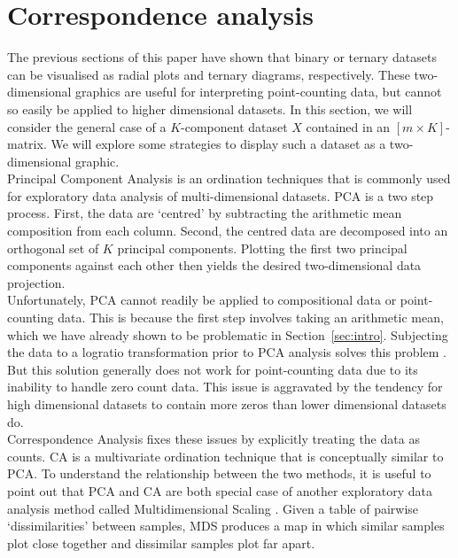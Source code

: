 \documentclass{article}
\begin{document}
\section{Correspondence analysis}
\label{sec:CA}

The previous sections of this paper have shown that binary or ternary
datasets can be visualised as radial plots and ternary diagrams,
respectively. These two-dimensional graphics are useful for
interpreting point-counting data, but cannot so easily be applied to
higher dimensional datasets. In this section, we will consider the
general case of a $K$-component dataset $X$ contained in an $[m \times
  K]$-matrix. We will explore some strategies to display such a
dataset as a two-dimensional graphic.\\

Principal Component Analysis \citep[PCA,][]{pearson1901} is an
ordination techniques that is commonly used for exploratory data
analysis of multi-dimensional datasets.  PCA is a two step
process. First, the data are `centred' by subtracting the arithmetic
mean composition from each column. Second, the centred data are
decomposed into an orthogonal set of $K$ principal components.
Plotting the first two principal components against each other then
yields the desired two-dimensional data projection.\\

Unfortunately, PCA cannot readily be applied to compositional data or
point-counting data. This is because the first step involves taking an
arithmetic mean, which we have already shown to be problematic
in Section~\ref{sec:intro}. Subjecting the data to a logratio
transformation prior to PCA analysis solves this problem
\citep{aitchison1983}. But this solution generally does not work for
point-counting data due to its inability to handle zero count data.
This issue is aggravated by the tendency for high dimensional datasets
to contain more zeros than lower dimensional datasets do.\\

Correspondence Analysis \citep[CA,][]{greenacre1984} fixes these
issues by explicitly treating the data as counts. CA is a multivariate
ordination technique that is conceptually similar to PCA.  To
understand the relationship between the two methods, it is useful to
point out that PCA and CA are both special case of another exploratory
data analysis method called Multidimensional Scaling
\citep[MDS,][]{kruskal1978, vermeesch2013}. Given a table of pairwise
`dissimilarities' between samples, MDS produces a map in which similar
samples plot close together and dissimilar samples plot far apart.\\
\end{document}
